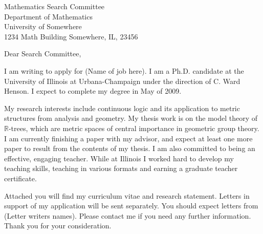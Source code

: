 \documentclass{letter}
\newcommand {\R}{\mathbb{R}}
\begin{document}
\begin{letter}{Mathematics Search Committee\\
Department of Mathematics\\
University of Somewhere\\
1234 Math Building
Somewhere, IL, 23456}


\opening{Dear Search Committee,}
I am writing to apply for (Name of job here).
I am a Ph.D. candidate at the University of Illinois at Urbana-Champaign under
the direction of C. Ward Henson. I expect to complete my degree in May of 2009.

My research interests include continuous logic
and its application to metric structures from analysis and geometry.
My thesis work is on the model theory of $\R$-trees, which are
metric spaces of central importance in geometric group theory.
I am currently finishing a paper 
with my advisor, and
expect at least one more paper to result from the contents of my thesis.
I am also committed to being an effective, engaging teacher.
While at Illinois I worked hard to
develop my teaching skills, teaching in various formats and earning
a graduate teacher certificate. 

Attached you will find my curriculum vitae and research statement.
Letters in support of my application will be sent separately. You should expect
letters from (Letter writers names). Please contact
me if you need any further information. 
Thank you for your consideration.



\end{letter}
\end{document}
